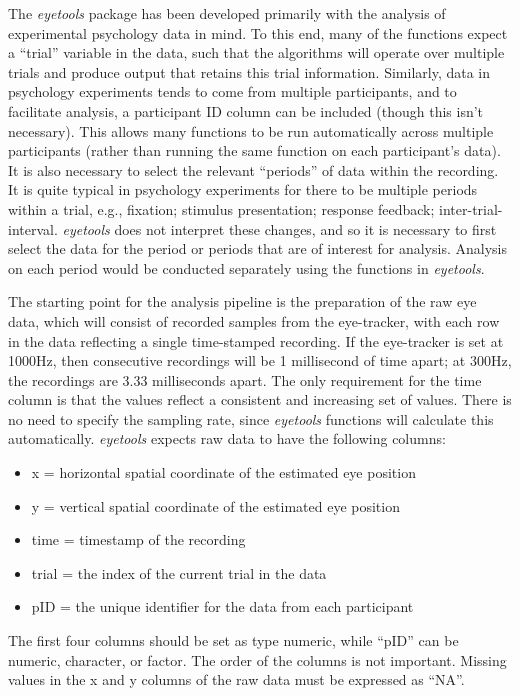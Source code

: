 \documentclass[
  man,
  floatsintext,
  longtable,
  nolmodern,
  notxfonts,
  notimes,
  colorlinks=true,linkcolor=blue,citecolor=blue,urlcolor=blue]{apa7}
\begin{document}
The \emph{eyetools} package has been developed primarily with the
analysis of experimental psychology data in mind. To this end, many of
the functions expect a ``trial'' variable in the data, such that the
algorithms will operate over multiple trials and produce output that
retains this trial information. Similarly, data in psychology
experiments tends to come from multiple participants, and to facilitate
analysis, a participant ID column can be included (though this isn't
necessary). This allows many functions to be run automatically across
multiple participants (rather than running the same function on each
participant's data). It is also necessary to select the relevant
``periods'' of data within the recording. It is quite typical in
psychology experiments for there to be multiple periods within a trial,
e.g., fixation; stimulus presentation; response feedback;
inter-trial-interval. \emph{eyetools} does not interpret these changes,
and so it is necessary to first select the data for the period or
periods that are of interest for analysis. Analysis on each period would
be conducted separately using the functions in \emph{eyetools}.

The starting point for the analysis pipeline is the preparation of the
raw eye data, which will consist of recorded samples from the
eye-tracker, with each row in the data reflecting a single time-stamped
recording. If the eye-tracker is set at 1000Hz, then consecutive
recordings will be 1 millisecond of time apart; at 300Hz, the recordings
are 3.33 milliseconds apart. The only requirement for the time column is
that the values reflect a consistent and increasing set of values. There
is no need to specify the sampling rate, since \emph{eyetools} functions
will calculate this automatically. \emph{eyetools} expects raw data to
have the following columns:

\begin{itemize}
\item
  x = horizontal spatial coordinate of the estimated eye position
\item
  y = vertical spatial coordinate of the estimated eye position
\item
  time = timestamp of the recording
\item
  trial = the index of the current trial in the data
\item
  pID = the unique identifier for the data from each participant
\end{itemize}

The first four columns should be set as type numeric, while ``pID'' can
be numeric, character, or factor. The order of the columns is not
important. Missing values in the x and y columns of the raw data must be
expressed as ``NA''.
\end{document}
